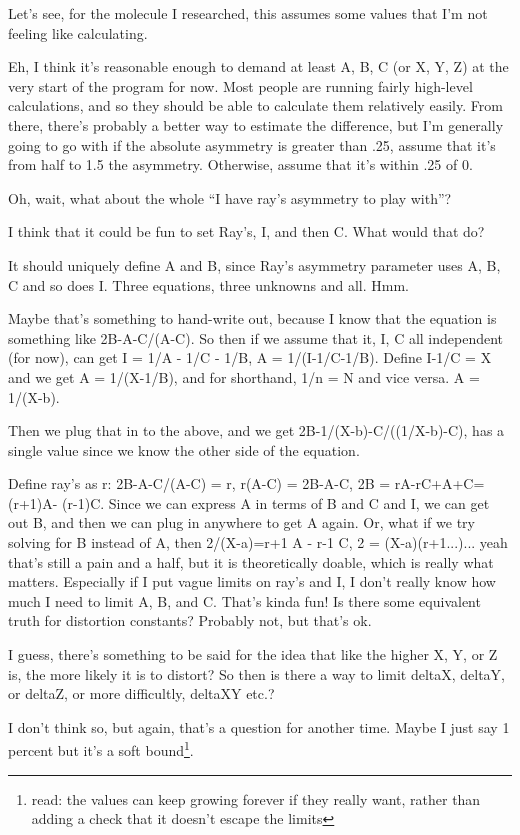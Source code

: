 \documentclass[12pt]{article}
\newcommand{\say}[1]{``#1''}
\renewcommand{\,}{\textsuperscript{,}}
\begin{document}
Let's see, for the molecule I researched, this assumes some values that I'm not feeling like calculating.

Eh, I think it's reasonable enough to demand at least A, B, C (or X, Y, Z) at the very start of the program for now.  
Most people are running fairly high-level calculations, and so they should be able to calculate them relatively easily.  
From there, there's probably a better way to estimate the difference, but I'm generally going to go with if the absolute asymmetry is greater than .25, assume that it's from half to 1.5 the asymmetry.  
Otherwise, assume that it's within .25 of 0.

Oh, wait, what about the whole \say{I have ray's asymmetry to play with}?

I think that it could be fun to set Ray's, I, and then C.  
What would that do?

It should uniquely define A and B, since Ray's asymmetry parameter uses A, B, C and so does I.  
Three equations, three unknowns and all.  
Hmm.

Maybe that's something to hand-write out, because I know that the equation is something like 2B-A-C/(A-C).  
So then if we assume that it, I, C all independent (for now), can get I = 1/A - 1/C - 1/B, A = 1/(I-1/C-1/B).  
Define I-1/C = X and we get A = 1/(X-1/B), and for shorthand, 1/n = N and vice versa.  
A = 1/(X-b).

Then we plug that in to the above, and we get 2B-1/(X-b)-C/((1/X-b)-C), has a single value since we know the other side of the equation.

Define ray's as r: 2B-A-C/(A-C) = r, r(A-C) = 2B-A-C, 2B = rA-rC+A+C= (r+1)A- (r-1)C. Since we can express A in terms of B and C and I, we can get out B, and then we can plug in anywhere to get A again. Or, what if we try solving for B instead of A, then 2/(X-a)=r+1 A - r-1 C, 2 = (X-a)(r+1...)... yeah that's still a pain and a half, but it is theoretically doable, which is really what matters.  
Especially if I put vague limits on ray's and I, I don't really know how much I need to limit A, B, and C.  
That's kinda fun!  
Is there some equivalent truth for distortion constants?  
Probably not, but that's ok.

I guess, there's something to be said for the idea that like the higher X, Y, or Z is, the more likely it is to distort? So then is there a way to limit deltaX, deltaY, or deltaZ, or more difficultly, deltaXY etc.?

I don't think so, but again, that's a question for another time.  
Maybe I just say 1 percent but it's a soft bound\footnote{read: the values can keep growing forever if they really want, rather than adding a check that it doesn't escape the limits}.
\end{document}
